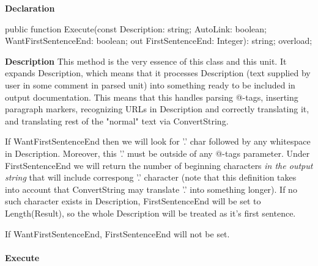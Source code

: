 \documentclass{report}
\newif\ifpdf
\begin{document}
\label{PasDoc_TagManager.TTagManager-Execute}
\begin{list}{}{
\setlength{\itemindent}{0cm}
\setlength{\listparindent}{0cm}
\setlength{\leftmargin}{\evensidemargin}
\addtolength{\leftmargin}{\tmplength}
\settowidth{\labelsep}{X}
\addtolength{\leftmargin}{\labelsep}
\setlength{\labelwidth}{\tmplength}
}
\item[\textbf{Declaration}\hfill]
\ifpdf
\begin{flushleft}
\fi
\begin{ttfamily}
public function Execute(const Description: string; AutoLink: boolean; WantFirstSentenceEnd: boolean; out FirstSentenceEnd: Integer): string; overload;\end{ttfamily}

\ifpdf
\end{flushleft}
\fi

\par
\item[\textbf{Description}]
This method is the very essence of this class and this unit. It expands Description, which means that it processes Description (text supplied by user in some comment in parsed unit) into something ready to be included in output documentation. This means that this handles parsing @{-}tags, inserting paragraph markers, recognizing URLs in Description and correctly translating it, and translating rest of the "normal" text via ConvertString.

If WantFirstSentenceEnd then we will look for '.' char followed by any whitespace in Description. Moreover, this '.' must be outside of any @{-}tags parameter. Under FirstSentenceEnd we will return the number of beginning characters \textit{in the output string} that will include correspong '.' character (note that this definition takes into account that ConvertString may translate '.' into something longer). If no such character exists in Description, FirstSentenceEnd will be set to Length(Result), so the whole Description will be treated as it's first sentence.

If WantFirstSentenceEnd, FirstSentenceEnd will not be set.

\end{list}
\paragraph*{Execute}\hspace*{\fill}
\end{document}
